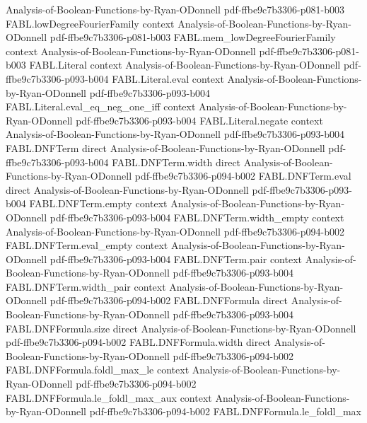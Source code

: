 \begin{theorem}
  {Analysis-of-Boolean-Functions-by-Ryan-ODonnell}
  {pdf-ffbe9c7b3306-p081-b003}
\proofstep
  {FABL.lowDegreeFourierFamily}
  {context}
  {Analysis-of-Boolean-Functions-by-Ryan-ODonnell}
  {pdf-ffbe9c7b3306-p081-b003}
\proofstep
  {FABL.mem_lowDegreeFourierFamily}
  {context}
  {Analysis-of-Boolean-Functions-by-Ryan-ODonnell}
  {pdf-ffbe9c7b3306-p081-b003}
\proofstep
  {FABL.Literal}
  {context}
  {Analysis-of-Boolean-Functions-by-Ryan-ODonnell}
  {pdf-ffbe9c7b3306-p093-b004}
\proofstep
  {FABL.Literal.eval}
  {context}
  {Analysis-of-Boolean-Functions-by-Ryan-ODonnell}
  {pdf-ffbe9c7b3306-p093-b004}
\proofstep
  {FABL.Literal.eval_eq_neg_one_iff}
  {context}
  {Analysis-of-Boolean-Functions-by-Ryan-ODonnell}
  {pdf-ffbe9c7b3306-p093-b004}
\proofstep
  {FABL.Literal.negate}
  {context}
  {Analysis-of-Boolean-Functions-by-Ryan-ODonnell}
  {pdf-ffbe9c7b3306-p093-b004}
\proofstep
  {FABL.DNFTerm}
  {direct}
  {Analysis-of-Boolean-Functions-by-Ryan-ODonnell}
  {pdf-ffbe9c7b3306-p093-b004}
\proofstep
  {FABL.DNFTerm.width}
  {direct}
  {Analysis-of-Boolean-Functions-by-Ryan-ODonnell}
  {pdf-ffbe9c7b3306-p094-b002}
\proofstep
  {FABL.DNFTerm.eval}
  {direct}
  {Analysis-of-Boolean-Functions-by-Ryan-ODonnell}
  {pdf-ffbe9c7b3306-p093-b004}
\proofstep
  {FABL.DNFTerm.empty}
  {context}
  {Analysis-of-Boolean-Functions-by-Ryan-ODonnell}
  {pdf-ffbe9c7b3306-p093-b004}
\proofstep
  {FABL.DNFTerm.width_empty}
  {context}
  {Analysis-of-Boolean-Functions-by-Ryan-ODonnell}
  {pdf-ffbe9c7b3306-p094-b002}
\proofstep
  {FABL.DNFTerm.eval_empty}
  {context}
  {Analysis-of-Boolean-Functions-by-Ryan-ODonnell}
  {pdf-ffbe9c7b3306-p093-b004}
\proofstep
  {FABL.DNFTerm.pair}
  {context}
  {Analysis-of-Boolean-Functions-by-Ryan-ODonnell}
  {pdf-ffbe9c7b3306-p093-b004}
\proofstep
  {FABL.DNFTerm.width_pair}
  {context}
  {Analysis-of-Boolean-Functions-by-Ryan-ODonnell}
  {pdf-ffbe9c7b3306-p094-b002}
\proofstep
  {FABL.DNFFormula}
  {direct}
  {Analysis-of-Boolean-Functions-by-Ryan-ODonnell}
  {pdf-ffbe9c7b3306-p093-b004}
\proofstep
  {FABL.DNFFormula.size}
  {direct}
  {Analysis-of-Boolean-Functions-by-Ryan-ODonnell}
  {pdf-ffbe9c7b3306-p094-b002}
\proofstep
  {FABL.DNFFormula.width}
  {direct}
  {Analysis-of-Boolean-Functions-by-Ryan-ODonnell}
  {pdf-ffbe9c7b3306-p094-b002}
\proofstep
  {FABL.DNFFormula.foldl_max_le}
  {context}
  {Analysis-of-Boolean-Functions-by-Ryan-ODonnell}
  {pdf-ffbe9c7b3306-p094-b002}
\proofstep
  {FABL.DNFFormula.le_foldl_max_aux}
  {context}
  {Analysis-of-Boolean-Functions-by-Ryan-ODonnell}
  {pdf-ffbe9c7b3306-p094-b002}
\proofstep
  {FABL.DNFFormula.le_foldl_max}

\end{theorem}
